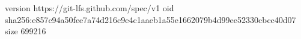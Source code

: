 version https://git-lfs.github.com/spec/v1
oid sha256:e857c94a50fee7a74d216c9e4c1aaeb1a55e1662079b4d99ee52330cbcc40d07
size 699216
